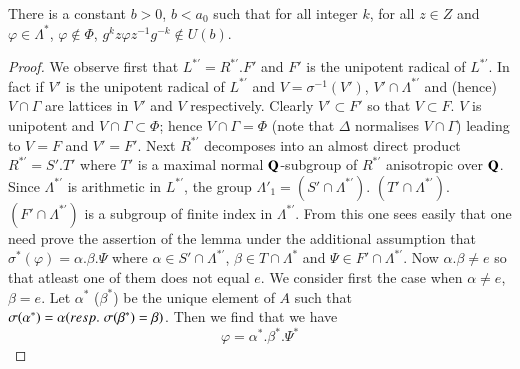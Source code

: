 \begin{lemma}\label{art9-lem2.35}
There is a constant $b > 0$, $b < a_0$ such that for all integer $k$, for all $z \in Z$ and $\varphi \in \Lambda^\ast$, $\varphi \not\in \Phi$, $g^k z \varphi z^{-1} g^{-k} \not\in U (b)$.
\end{lemma}

\begin{proof}
We observe first that $L^{\ast'} = R^{\ast'}. F'$ and $F'$ is the unipotent radical of $L^{\ast'}$. In fact if $V'$ is the unipotent radical of $L^{\ast'}$ and $V = \sigma^{-1} (V')$, $V' \cap \Lambda^{\ast'}$ and (hence) $V \cap \Gamma$ are lattices in $V'$ and $V$ respectively. Clearly $V' \subset F'$ so that $V \subset F$. $V$ is unipotent and $V \cap \Gamma \subset \Phi$; hence $V \cap \Gamma = \Phi$ (note that $\Delta$ normalises $V \cap \Gamma$) leading to $V = F$ and $V' = F'$. Next $R^{\ast'}$ decomposes into an almost direct product $R^{\ast'} = S'. T'$ where $T'$ is a maximal normal $\mathbf{Q}$-subgroup of $R^{\ast'}$ anisotropic over $\mathbf{Q}$. Since $\Lambda^{\ast'}$ is arithmetic in $L^{\ast'}$, the group $\Lambda'_1 = (S' \cap \Lambda^{\ast'})$. $(T' \cap \Lambda^{\ast'})$. $(F' \cap \Lambda^{\ast'})$ is a subgroup of finite index in $\Lambda^{\ast'}$. From this one sees easily that one need prove the assertion of the lemma under the additional assumption that $\sigma^\ast(\varphi) = \alpha. \beta. \Psi$ where $\alpha \in S' \cap \Lambda^{\ast'}$, $\beta \in T \cap \Lambda^\ast$ and $\Psi \in F' \cap \Lambda^{\ast'}$. Now $\alpha. \beta \neq e$ so that atleast one of them does not equal $e$. We consider first the case when $\alpha \neq e$, $\beta = e$. Let $\alpha^\ast$ (\resp $\beta^\ast$) be the unique element of $A$ such that $\sigma (\alpha^\ast) = \alpha ({resp.}\kern.3em \sigma (\beta^\ast) = \beta)$. Then we find that we have
$$
\varphi = \alpha^\ast . \beta^\ast. \Psi^\ast
$$

\end{proof}
